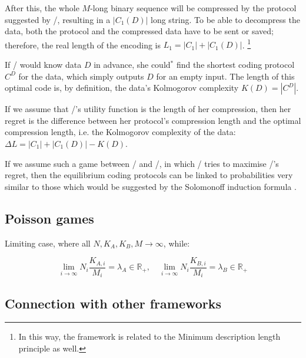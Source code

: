 \documentclass{article}
\theoremstyle{definition}
\begin{document}
After this, the whole $M$-long binary sequence will be compressed by the protocol suggested by \PI/, resulting in a $|C_1(D)|$ long string. To be able to decompress the data, both the protocol and the compressed data have to be sent or saved; therefore, the real length of the encoding is $L_1 = |C_1| + |C_1(D)|$. \footnote{In this way, the framework is related to the Minimum description length principle \cite{book:MinimumDescriptionLength,arxiv:MinimumDescriptionLengthRevisited} as well.}

If \PI/ would know data $D$ in advance, she could${}^*$ find the shortest coding protocol $C^D$ for the data, which simply outputs $D$ for an empty input.
The length of this optimal code is, by definition, the data's Kolmogorov complexity \cite{book:Vitanyi} $K(D)=|C^D|$.

If we assume that \PI/'s utility function is the length of her compression, then her regret is the difference between her protocol's compression length and the optimal compression length, i.e. the Kolmogorov complexity of the data:
$\Delta L = |C_1| + |C_1(D)| - K(D)$.

If we assume such a game between \PI/ and \PII/, in which \PII/ tries to maximise \PI/'s regret, then the equilibrium coding protocols can be linked to probabilities very similar to those which would be suggested by the Solomonoff induction formula \cite{book:Solomonoff,book:UniversalArtificialIntelligence}.

\subsection{Poisson games}

Limiting case, where all $N, K_A, K_B, M \to \infty$, while:

\begin{equation}
    \lim_{i \to \infty} N_i \frac{K_{A,i}}{M_i} = \lambda_A \in \mathbb{R}_+, \quad \lim_{i \to \infty} N_i \frac{K_{B,i}}{M_i} = \lambda_B \in \mathbb{R}_+
\end{equation}


\subsection{Connection with other frameworks}
\end{document}
